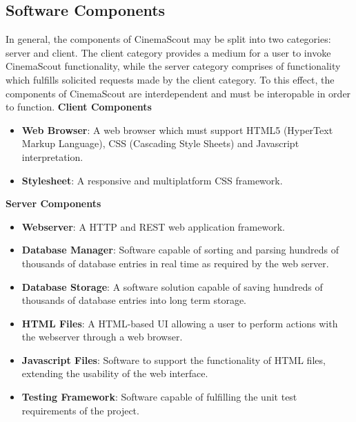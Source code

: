 \documentclass{article}
\begin{document}
\subsection{Software Components}
In general, the components of CinemaScout may be split into two categories: 
server and client. The client category provides a medium for a user to invoke
CinemaScout functionality, while the server category comprises of functionality 
which fulfills solicited requests made by the client category. To this effect,
the components of CinemaScout are interdependent and must be interopable in
order to function.\newline\newline
\textbf{Client Components}
\begin{itemize}
\item \textbf{Web Browser}: A web browser which must support HTML5 (HyperText 
Markup Language), CSS (Cascading Style Sheets) and Javascript interpretation.
\item \textbf{Stylesheet}: A responsive and multiplatform CSS framework.
\end{itemize}
\textbf{Server Components}
\begin{itemize}
\item \textbf{Webserver}: A HTTP and REST web application framework.
\item \textbf{Database Manager}: Software capable of sorting and parsing
hundreds of thousands of database entries in real time as required by the
web server.
\item \textbf{Database Storage}: A software solution capable of saving hundreds
of thousands of database entries into long term storage.
\item \textbf{HTML Files}: A HTML-based UI allowing a user to perform actions
with the webserver through a web browser.
\item \textbf{Javascript Files}: Software to support the functionality of
HTML files, extending the usability of the web interface.
\item \textbf{Testing Framework}: Software capable of fulfilling the unit
test requirements of the project.
\end{itemize}
\end{document}
